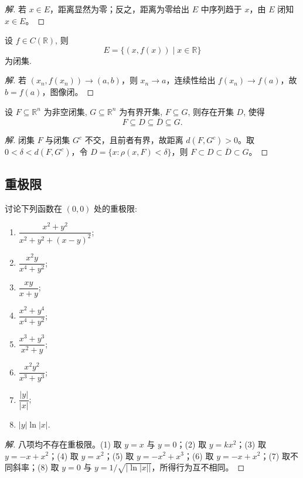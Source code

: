 \documentclass[../../数学分析培优讲义(答案版).tex]{subfiles}
\begin{document}
\begin{proof}[解]
若 $x\in E$，距离显然为零；反之，距离为零给出 $E$ 中序列趋于 $x$，由 $E$ 闭知 $x\in E$。
\end{proof}

\begin{example}
设 $f\in C(\mathbb{R})$, 则
\[
    E=\{(x,f(x))\mid x\in\mathbb{R}\}
\]
为闭集.
\end{example}

\begin{proof}[解]
若 $(x_n,f(x_n))\to(a,b)$，则 $x_n\to a$，连续性给出 $f(x_n)\to f(a)$，故 $b=f(a)$，图像闭。
\end{proof}

\begin{example}
设 $F\subseteq\mathbb{R}^n$ 为非空闭集, $G\subseteq\mathbb{R}^n$ 为有界开集, $F\subseteq G$, 则存在开集 $D$, 使得
\[
    F\subseteq D\subseteq\overline D\subseteq G.
\]
\end{example}

\begin{proof}[解]
闭集 $F$ 与闭集 $G^c$ 不交，且前者有界，故距离 $d(F,G^c)>0$。取 $0<\delta<d(F,G^c)$，令 $D=\{x:\rho(x,F)<\delta\}$，则 $F\subset D\subset\overline D\subset G$。
\end{proof}

\subsection{重极限}

\begin{example}
讨论下列函数在 $(0,0)$ 处的重极限:
\begin{enumerate}[label=(\arabic*)]
    \item $\displaystyle\dfrac{x^2+y^2}{x^2+y^2+(x-y)^2}$;
    \item $\displaystyle\dfrac{x^2y}{x^4+y^2}$;
    \item $\displaystyle\dfrac{xy}{x+y}$;
    \item $\displaystyle\dfrac{x^2+y^4}{x^4+y^2}$;
    \item $\displaystyle\dfrac{x^3+y^3}{x^2+y}$;
    \item $\displaystyle\dfrac{x^2y^2}{x^3+y^3}$;
    \item $\displaystyle\dfrac{|y|}{|x|}$;
    \item $|y|\ln|x|$.
\end{enumerate}
\end{example}

\begin{proof}[解]
八项均不存在重极限。(1) 取 $y=x$ 与 $y=0$；(2) 取 $y=kx^2$；(3) 取 $y=-x+x^2$；(4) 取 $y=x^2$；(5) 取 $y=-x^2+x^3$；(6) 取 $y=-x+x^2$；(7) 取不同斜率；(8) 取 $y=0$ 与 $y=1/\sqrt{|\ln|x||}$，所得行为互不相同。
\end{proof}
\end{document}
